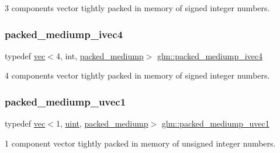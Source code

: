 3 components vector tightly packed in memory of signed integer numbers. 

\mbox{\label{group__gtc__type__aligned_gaea233dbda2d6eccdc4b72178eea9430f}} 
\subsubsection{\texorpdfstring{packed\+\_\+mediump\+\_\+ivec4}{packed\_mediump\_ivec4}}
{\footnotesize\ttfamily typedef \hyperlink{structglm_1_1vec}{vec}$<$4, int, \hyperlink{namespaceglm_a36ed105b07c7746804d7fdc7cc90ff25a9604654c3b137cd7898689fd34b25bc0}{packed\+\_\+mediump}$>$ \hyperlink{group__gtc__type__aligned_gaea233dbda2d6eccdc4b72178eea9430f}{glm\+::packed\+\_\+mediump\+\_\+ivec4}}



4 components vector tightly packed in memory of signed integer numbers. 

\mbox{\label{group__gtc__type__aligned_ga2fd382e54fcf213b330d448f83738636}} 
\subsubsection{\texorpdfstring{packed\+\_\+mediump\+\_\+uvec1}{packed\_mediump\_uvec1}}
{\footnotesize\ttfamily typedef \hyperlink{structglm_1_1vec}{vec}$<$1, \hyperlink{group__core__precision_ga4fd29415871152bfb5abd588334147c8}{uint}, \hyperlink{namespaceglm_a36ed105b07c7746804d7fdc7cc90ff25a9604654c3b137cd7898689fd34b25bc0}{packed\+\_\+mediump}$>$ \hyperlink{group__gtc__type__aligned_ga2fd382e54fcf213b330d448f83738636}{glm\+::packed\+\_\+mediump\+\_\+uvec1}}



1 component vector tightly packed in memory of unsigned integer numbers. 

